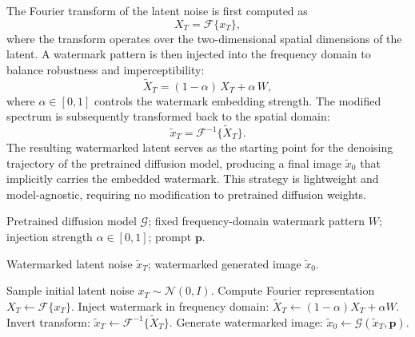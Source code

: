 The Fourier transform of the latent noise is first computed as
\begin{equation}
    X_T = \mathcal{F}\{x_T\},
\end{equation}
where the transform operates over the two-dimensional spatial dimensions of the latent.
A watermark pattern is then injected into the frequency domain to balance robustness and imperceptibility:
\begin{equation}
    \tilde{X}_T = (1-\alpha)\,X_T + \alpha\,W,
\end{equation}
where \(\alpha \in [0,1]\) controls the watermark embedding strength.
The modified spectrum is subsequently transformed back to the spatial domain:
\begin{equation}
    \tilde{x}_T = \mathcal{F}^{-1}\{\tilde{X}_T\}.
\end{equation}
The resulting watermarked latent serves as the starting point for the denoising trajectory of the pretrained diffusion model, producing a final image \(\tilde{x}_0\) that implicitly carries the embedded watermark.
This strategy is lightweight and model-agnostic, requiring no modification to pretrained diffusion weights.


\begin{algorithm}[t]
\caption{Watermark Injection and Watermarked Image Generation}
\label{alg:injection_generation}
\begin{algorithmic}[1]
\Require
Pretrained diffusion model $\mathcal{G}$;
fixed frequency-domain watermark pattern $W$;
injection strength $\alpha \in [0,1]$;
prompt $\mathbf{p}$.

\Ensure
Watermarked latent noise $\tilde{x}_T$;
watermarked generated image $\tilde{x}_0$.

\State Sample initial latent noise $x_T \sim \mathcal{N}(0,I)$.
\State Compute Fourier representation $X_T \leftarrow \mathcal{F}\{x_T\}$.
\State Inject watermark in frequency domain:
\State \hspace{1.2em} $\tilde{X}_T \leftarrow (1-\alpha)X_T + \alpha W$.
\State Invert transform: $\tilde{x}_T \leftarrow \mathcal{F}^{-1}\{\tilde{X}_T\}$.
\State Generate watermarked image: $\tilde{x}_0 \leftarrow \mathcal{G}(\tilde{x}_T, \mathbf{p})$.
\end{algorithmic}
\end{algorithm}


